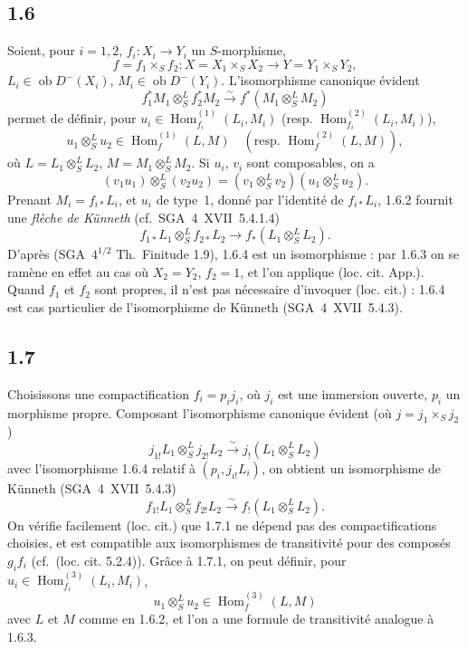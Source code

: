 \documentclass[11pt]{article}
\DeclareMathOperator{\Hom}{Hom}
\newcommand{\ob}{\operatorname{ob}}
\providecommand{\Hom}{\operatorname{Hom}}
\providecommand{\ob}{\operatorname{ob}}
\providecommand{\Hom}{\operatorname{Hom}}
\begin{document}
\subsection*{1.6}
Soient, pour $i=1,2$, $f_i:X_i\to Y_i$ un $S$-morphisme,
\[
f=f_1\times_S f_2:X=X_1\times_S X_2\to Y=Y_1\times_S Y_2,
\]
$L_i\in\ob D^{-}(X_i)$, $M_i\in\ob D^{-}(Y_i)$. L'isomorphisme canonique évident
\begin{equation}\tag{1.6.1}
f_1^{*}M_1\otimes^{L}_{S}f_2^{*}M_2\xrightarrow{\sim}f^{*}(M_1\otimes^{L}_{S}M_2)
\end{equation}
permet de définir, pour $u_i\in\Hom_{f_i}^{(1)}(L_i,M_i)$ (resp. $\Hom_{f_i}^{(2)}(L_i,M_i)$),
\begin{equation}\tag{1.6.2}
u_1\otimes^{L}_{S}u_2\in\Hom_{f}^{(1)}(L,M)\quad(\text{resp. }\Hom_f^{(2)}(L,M)),
\end{equation}
où $L=L_1\otimes^{L}_{S}L_2$, $M=M_1\otimes^{L}_{S}M_2$. Si $u_i$, $v_i$ sont composables, on a
\begin{equation}\tag{1.6.3}
(v_1u_1)\otimes^{L}_{S}(v_2u_2)=(v_1\otimes^{L}_{S}v_2)(u_1\otimes^{L}_{S}u_2).
\end{equation}
Prenant $M_i=f_{i*}L_i$, et $u_i$ de type~1, donné par l'identité de $f_{i*}L_i$, 1.6.2 fournit une \emph{flèche de Künneth} (cf.~SGA~4~XVII~5.4.1.4)
\begin{equation}\tag{1.6.4}
f_{1*}L_1\otimes^{L}_{S}f_{2*}L_2\longrightarrow f_{*}(L_1\otimes^{L}_{S}L_2).
\end{equation}
D'après (SGA~$4^{1/2}$ Th.~Finitude 1.9), 1.6.4 est un isomorphisme : par 1.6.3 on se ramène en effet au cas où $X_2=Y_2$, $f_2=1$, et l'on applique (loc. cit. App.). Quand $f_1$ et $f_2$ sont propres, il n'est pas nécessaire d'invoquer (loc. cit.) : 1.6.4 est cas particulier de l'isomorphisme de Künneth (SGA~4~XVII~5.4.3).

\subsection*{1.7}
Choisissons une compactification $f_i=p_i j_i$, où $j_i$ est une immersion ouverte, $p_i$ un morphisme propre. Composant l'isomorphisme canonique évident (où $j=j_1\times_S j_2$)
\[
j_{1!}L_1\otimes^{L}_{S}j_{2!}L_2\xrightarrow{\sim}j_{!}(L_1\otimes^{L}_{S}L_2)
\]
avec l'isomorphisme 1.6.4 relatif à $(p_i,j_{i!}L_i)$, on obtient un isomorphisme de Künneth (SGA~4~XVII~5.4.3)
\begin{equation}\tag{1.7.1}
f_{1!}L_1\otimes^{L}_{S}f_{2!}L_2\xrightarrow{\sim}f_{!}(L_1\otimes^{L}_{S}L_2).
\end{equation}
On vérifie facilement (loc. cit.) que 1.7.1 ne dépend pas des compactifications choisies, et est compatible aux isomorphismes de transitivité pour des composés $g_if_i$ (cf.~(loc. cit. 5.2.4)). Grâce à 1.7.1, on peut définir, pour $u_i\in\Hom_{f_i}^{(3)}(L_i,M_i)$,
\begin{equation}\tag{1.7.2}
u_1\otimes^{L}_{S}u_2\in\Hom_f^{(3)}(L,M)
\end{equation}
avec $L$ et $M$ comme en 1.6.2, et l'on a une formule de transitivité analogue à 1.6.3.
\end{document}

